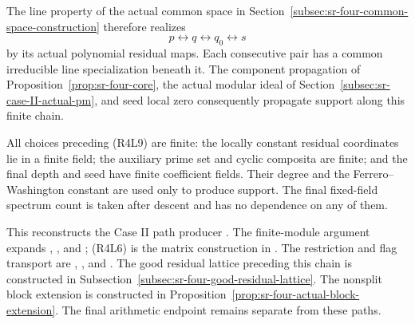 The line property of the actual common space in
Section~\ref{subsec:sr-four-common-space-construction}
therefore realizes
\[
                         p\longleftrightarrow q
                          \longleftrightarrow q_0
                          \longleftrightarrow s            \tag{R4L9}
\]
by its actual polynomial residual maps.
Each consecutive pair has a common irreducible line
specialization beneath it.
The component propagation of
Proposition~\ref{prop:sr-four-core}, the actual modular ideal
of Section~\ref{subsec:sr-case-II-actual-pm}, and seed local
zero consequently propagate support along this finite chain.

All choices preceding (R4L9) are finite:
the locally constant residual coordinates lie in a finite
field; the auxiliary prime set and cyclic composita are
finite; and the final depth and seed have finite coefficient
fields. Their degree and the Ferrero--Washington constant
are used only to produce support. The final fixed-field
spectrum count is taken after descent and has no dependence
on any of them.

This reconstructs the Case II path producer
.
The finite-module argument expands
, ,
and ; (R4L6) is the matrix construction in
.
The restriction and flag transport are
, , and .
The good residual lattice preceding this chain is constructed in
Subsection~\ref{subsec:sr-four-good-residual-lattice}.
The nonsplit block extension is constructed in
Proposition~\ref{prop:sr-four-actual-block-extension}.
The final arithmetic endpoint remains separate from these paths.
